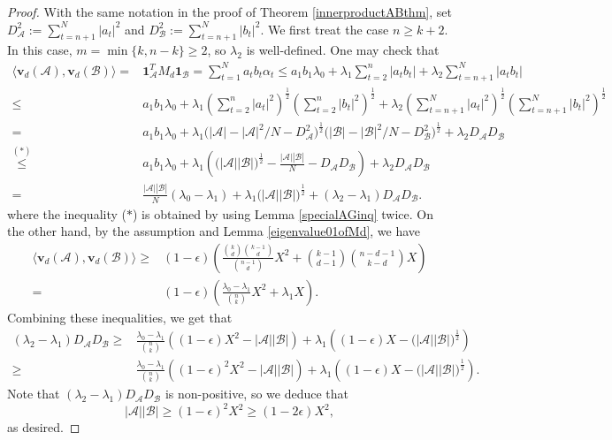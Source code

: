 \documentclass[10pt,a4paper]{amsart}
\numberwithin{equation}{section}
\def\A{\mathcal{A}}
\def\B{\mathcal{B}}
\def\v{\mathbf{v}}
\def\1{\mathbf{1}}
\begin{document}
\begin{proof}
With the same notation in the proof of Theorem \ref{innerproductABthm}, set $D_\A^2:=\sum_{t=n+1}^N |a_t|^2$ and $D_\B^2:=\sum_{t=n+1}^N |b_t|^2$.
We first treat the case $n\geq k+2$.
In this case, $m=\min\{k,n-k\}\geq 2$, so $\lambda_2$ is well-defined.
One may check that
\begin{align*}
\big\langle \mathbf{v}_d(\A),\mathbf{v}_d(\B)\big\rangle
=&\1_\A^TM_d \1_\B
=   \sum_{t=1}^N a_t b_t \alpha_t
\leq    a_1 b_1 \lambda _0 + \lambda _1 \sum_{t=2}^n |a_t b_t |+ \lambda _2 \sum_{t=n+1}^N |a_t b_t |\\
\leq & a_1 b_1 \lambda _0 + \lambda _1\left(\sum_{t=2}^n |a_t|^2\right)^{\frac{1}{2}}
\left(\sum_{t=2}^n |b_t|^2\right)^{\frac{1}{2}}
+ \lambda _2\left(\sum_{t=n+1}^N |a_t|^2\right)^{\frac{1}{2}}
\left(\sum_{t=n+1}^N |b_t|^2\right)^{\frac{1}{2}}\\
= &a_1 b_1 \lambda _0 + \lambda _1\Big(|\A|-|\A|^2/ N -D_\A^2\Big)^{\frac{1}{2}}
\Big(|\B|-|\B|^2/ N -D_\B^2\Big)^{\frac{1}{2}}
+ \lambda _2D_\A D_\B\\
\overset{(\ast)}{\leq} & a_1 b_1 \lambda _0 + \lambda _1\left(\big(|\A||\B|\big)^{\frac{1}{2}}- \frac{|\A||\B|}{N}-D_\A D_\B\right)
+ \lambda _2D_\A D_\B\\
= & \frac{|\A||\B|}{N}\left(\lambda _0 - \lambda _1\right)+\lambda _1\big(|\A||\B|\big)^{\frac{1}{2}}
+\left(\lambda _2-\lambda _1\right)D_\A D_\B.
\end{align*}
where the inequality ($\ast$) is obtained by using Lemma \ref{specialAGinq} twice.
On the other hand, by the assumption and Lemma \ref{eigenvalue01ofMd}, we have
\begin{align*}
\big\langle\v_d(\A),\v_d(\B)\big\rangle
\geq& (1-\epsilon) \left(\frac{\binom{k}{d}\binom{k-1}{d}}{\binom{n-1}{d}} X^2
+\binom{k-1}{d-1} \binom{n-d-1}{k-d} X\right)\\
=&(1-\epsilon)\left( \frac{\lambda _0-\lambda _1}{ \binom{n}{k} } X^2
+\lambda _1  X\right).
\end{align*}
Combining these inequalities, we get that
\begin{align*}
\left(\lambda _2-\lambda _1\right)D_\A D_\B
\geq& \frac{\lambda _0-\lambda _1}{ \binom{n}{k} }
\left((1-\epsilon) X^2- |\A||\B|\right)
+\lambda _1 \left((1-\epsilon) X-\big(|\A||\B|\big)^{\frac{1}{2}}\right)\\
\geq& \frac{\lambda _0-\lambda _1}{ \binom{n}{k} }
\left((1-\epsilon)^2 X^2- |\A||\B|\right)
+\lambda _1 \left((1-\epsilon) X-\big(|\A||\B|\big)^{\frac{1}{2}}\right).
\end{align*}
Note that $\left(\lambda _2-\lambda _1\right)D_\A D_\B$ is non-positive,
so we deduce that
$$|\A||\B|\geq (1-\epsilon)^2X^2
\geq(1-2\epsilon) X^2,$$
as desired.


\end{proof}
\end{document}
